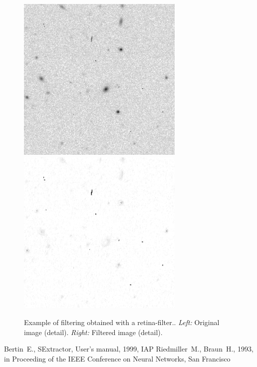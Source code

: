\documentclass[11pt,titlepage]{article}
\begin{document}
   \begin{figure}[htbp]
      \centerline{\includegraphics[width=8cm]{ps/cr1.ps}
		\includegraphics[width=8cm]{ps/cr2.ps}}
      \caption{
              Example of filtering obtained with a retina-filter..
              {\it Left:} Original image (detail). {\it Right:} Filtered
              image (detail).
              }
      \label{fig:result}
   \end{figure}


\begin{thebibliography}{99}
    Bertin~E., SExtractor, User's manual, 1999, IAP
    Riedmiller~M., Braun~H., 1993, in Proceeding of the
            IEEE Conference on Neural Networks, San Francisco
\end{thebibliography}
\end{document}
